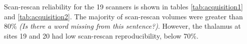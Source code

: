 Scan-rescan reliability for the 19 scanners is shown in tables \ref{tab:acquisition1} and \ref{tab:acquisition2}. The majority of scan-rescan volumes were greater than 80\% \textit{(Is there a word missing from this sentence?)}. However, the thalamus at sites 19 and 20 had low scan-rescan reproducibility, below 70\%. %